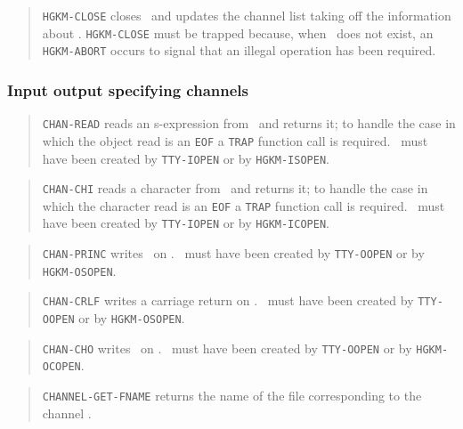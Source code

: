 \begin{quote}
	{\tt HGKM-CLOSE} closes \chan\ and updates the channel list taking off the
	information about \chan.
	{\tt HGKM-CLOSE} must be trapped because, when \chan\ does not exist, an
	{\tt HGKM-ABORT} occurs to signal that an illegal operation has been required.
\end{quote}


\subsubsection{Input output specifying channels}

\begin{quote}
	{\tt CHAN-READ} reads an s-expression from \chan\ and returns it; to handle
	the case in which the object read is an {\tt EOF} a {\tt TRAP} function call
	is required. 
	\chan\ must have been created by {\tt TTY-IOPEN} or by {\tt HGKM-ISOPEN}.
\end{quote}

\begin{quote}
	{\tt CHAN-CHI} reads a character from \chan\ and returns it; to handle the
	case in which the character read is an {\tt EOF} a {\tt TRAP} function call
	is required. 
	\chan\ must have been created by {\tt TTY-IOPEN} or by {\tt HGKM-ICOPEN}.
\end{quote}

\begin{quote}
	{\tt CHAN-PRINC} writes \obj\ on \chan.
	\chan\ must have been created by {\tt TTY-OOPEN} or by {\tt HGKM-OSOPEN}.
\end{quote}

\begin{quote}
	{\tt CHAN-CRLF} writes a carriage return on \chan.
	\chan\ must have been created by {\tt TTY-OOPEN} or by {\tt HGKM-OSOPEN}.
\end{quote}

\begin{quote}
	{\tt CHAN-CHO} writes \chr\ on \chan.
	\chan\ must have been created by {\tt TTY-OOPEN} or by {\tt HGKM-OCOPEN}.
\end{quote}

\begin{quote}
	{\tt CHANNEL-GET-FNAME} returns the name of the file corresponding to the
	channel \chan.
\end{quote}


